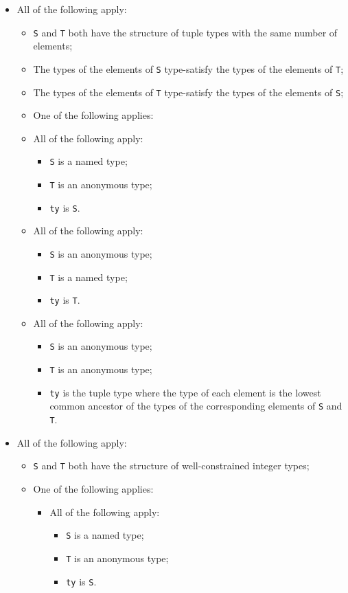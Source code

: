 \documentclass{book}
\begin{document}
\begin{itemize}
  \item All of the following apply:
    \begin{itemize}
    \item \texttt{S} and \texttt{T} both have the structure of tuple types with the same number of elements;
    \item The types of the elements of \texttt{S} type-satisfy the types of the elements of \texttt{T};
    \item The types of the elements of \texttt{T} type-satisfy the types of the elements of \texttt{S};
    \item One of the following applies:

      \item All of the following apply:
        \begin{itemize}
        \item \texttt{S} is a named type;
        \item \texttt{T} is an anonymous type;
        \item \texttt{ty} is \texttt{S}.
        \end{itemize}

      \item All of the following apply:
        \begin{itemize}
        \item \texttt{S} is an anonymous type;
        \item \texttt{T} is a named type;
        \item \texttt{ty} is \texttt{T}.
        \end{itemize}

     \item All of the following apply:
        \begin{itemize}
        \item \texttt{S} is an anonymous type;
        \item \texttt{T} is an anonymous type;
	\item \texttt{ty} is the tuple type where the type of each element is the lowest common
	  ancestor of the types of the corresponding elements of \texttt{S} and \texttt{T}.
        \end{itemize}
    \end{itemize}

  \item All of the following apply:
    \begin{itemize}
    \item \texttt{S} and \texttt{T} both have the structure of well-constrained integer types;
    \item One of the following applies:
      \begin{itemize}
      \item All of the following apply:
        \begin{itemize}
        \item \texttt{S} is a named type;
        \item \texttt{T} is an anonymous type;
        \item \texttt{ty} is \texttt{S}.
        \end{itemize}


\end{itemize}
\end{itemize}
\end{itemize}
\end{document}
